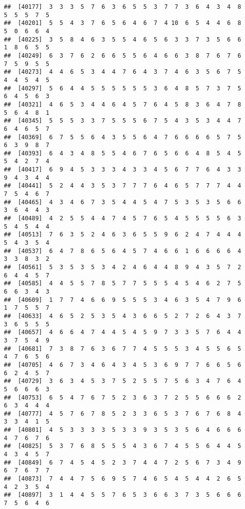 \documentclass[
]{book}
\begin{document}
\begin{verbatim}
##  [40177]  3  3  3  5  7  6  3  6  5  5  3  7  7  3  6  4  3  4  8  5  5  5  7  5
##  [40201]  5  5  4  3  7  6  5  6  4  6  7  4 10  6  5  4  4  6  8  5  0  6  6  4
##  [40225]  3  5  8  4  6  3  5  5  4  6  5  6  3  3  7  3  5  6  6  1  8  6  5  5
##  [40249]  6  3  7  6  2  6  6  5  5  6  4  6  6  3  8  7  6  7  6  7  5  9  5  5
##  [40273]  4  4  6  5  3  4  4  7  6  4  3  7  4  6  3  5  6  7  5  4  4  5  4  5
##  [40297]  5  6  4  4  5  5  5  5  5  5  3  6  4  8  5  7  3  7  5  6  4  5  6  3
##  [40321]  4  6  5  3  4  4  6  4  5  7  6  4  5  8  3  6  4  7  8  5  6  4  8  1
##  [40345]  5  5  5  3  3  7  5  5  5  6  7  5  4  3  5  3  4  4  7  6  4  6  5  7
##  [40369]  6  7  5  5  6  4  3  5  5  6  4  7  6  6  6  6  5  7  5  6  3  9  8  7
##  [40393]  6  4  3  4  8  5  5  4  6  7  6  5  6  6  4  8  5  4  5  5  4  2  7  4
##  [40417]  6  9  4  5  3  3  3  4  3  3  4  5  6  7  7  6  4  3  3  9  4  3  4  4
##  [40441]  5  2  4  4  3  5  3  7  7  7  6  4  6  5  7  7  7  4  4  7  5  4  6  7
##  [40465]  4  3  4  6  7  3  5  4  4  5  4  7  5  3  5  3  5  6  6  3  6  4  4  3
##  [40489]  4  2  5  5  4  4  7  4  5  7  6  5  4  5  5  5  5  6  3  5  4  5  4  4
##  [40513]  7  6  3  5  2  4  6  3  6  5  5  9  6  2  4  7  4  4  4  5  4  3  5  4
##  [40537]  6  4  7  8  6  5  6  4  5  7  4  6  6  1  6  6  6  6  4  3  3  8  3  2
##  [40561]  5  3  5  3  5  3  4  2  4  6  4  4  8  9  4  3  5  7  2  6  4  4  5  7
##  [40585]  4  4  5  5  7  8  5  7  7  5  5  5  4  5  4  6  2  7  5  6  6  3  4  3
##  [40609]  1  7  7  4  6  6  9  5  5  5  3  4  6  3  5  4  7  9  6  1  7  5  5  7
##  [40633]  4  6  5  2  5  3  5  4  3  6  6  5  2  7  2  6  4  3  7  3  6  5  5  5
##  [40657]  4  6  6  4  7  4  4  5  4  5  9  7  3  3  5  7  6  4  4  3  7  5  4  9
##  [40681]  7  3  8  7  6  3  6  7  7  4  5  5  5  3  4  5  5  6  5  4  7  6  5  6
##  [40705]  4  6  7  3  4  6  4  3  4  5  3  6  9  7  7  6  6  5  6  6  2  4  5  7
##  [40729]  3  6  3  4  5  3  7  5  2  5  5  7  5  6  3  4  7  6  4  5  6  6  6  3
##  [40753]  6  5  4  7  6  7  5  2  3  6  3  7  2  5  5  6  6  6  2  6  3  4  4  4
##  [40777]  4  5  7  6  7  8  5  2  3  3  6  5  3  7  6  7  6  8  4  3  3  4  1  5
##  [40801]  4  5  3  3  3  3  5  3  3  9  3  5  3  5  6  4  6  6  6  4  7  6  7  6
##  [40825]  5  3  7  6  8  5  5  5  4  3  6  7  4  5  5  6  4  4  5  4  3  4  5  7
##  [40849]  6  7  4  5  4  5  2  3  7  4  4  7  2  5  6  7  3  4  9  6  7  6  7  7
##  [40873]  7  4  4  7  5  6  9  5  7  4  6  5  4  5  4  4  2  6  5  4  2  3  5  4
##  [40897]  3  1  4  4  5  5  7  6  5  3  6  6  3  7  3  5  6  6  6  7  5  6  4  6

\end{verbatim}
\end{document}
